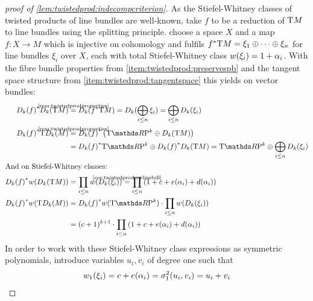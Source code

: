 \begin{proof}[proof of \autoref{lem:twistedprod:indecompcriterion}]
  As the Stiefel-Whitney classes of twisted products of line bundles
  are well-known, take $f$ to be a reduction of $\mathrm{T}M$ to line bundles
  using the splitting principle.
  \Idest choose a space $X$ and a map $f\colon X\to M$ which is
  injective on cohomology and fulfils
  ${f}^* \mathrm{T}M = \xi_1\oplus\dotsb\oplus\xi_n$ for line bundles
  $\xi_i$ over $X$, each with total Stiefel-Whitney class
  ${w}(\xi_i)=1+\alpha_i$.
  With the fibre bundle properties from
  \ref{item:twistedprod:preservespb}
  and the tangent space structure from
  \ref{item:twistedprod:tangentspace}
  this yields on vector bundles:
  \begin{align*}
    \pb{\Twistedprod{k}{f}} \Twistedprod{k}{\T M}
    &\cequalsby{\autoref{rem:twistedprodproperties}}
      \Twistedprod{k}{\pb f \T M}
      = \Twistedprod{k}{\bigoplus_{i\leq n}\xi_i}
      = \bigoplus_{i\leq n}\Twistedprod{k}{\xi_i}
    \\
    \pb{\Twistedprod{k}{f}} \T{\Twistedprod{k}{M}}
    &\cequalsby{\autoref{rem:twistedprodproperties}}
      \pb{\Twistedprod{k}{f}} \left(
      \T{\RP k} \oplus \Twistedprod{k}{\T M}
      \right)\\
    &= \pb{\Twistedprod{k}{f}} \T{\RP k}
      \oplus
      \pb{\Twistedprod{k}{f}} \Twistedprod{k}{\T M}
      = \T{\RP k} \oplus \bigoplus_{i\leq n}\Twistedprod{k}{\xi_i}\\
    \intertext{And on Stiefel-Whitney classes:}
    \pb{\Twistedprod{k}{f}} \W{\Twistedprod{k}{\T M}}
    &= \prod_{i\leq n} \W{\Twistedprod{k}{\xi_i}}
      \cequalsby{\autoref{cor:twistedprod:swlinebdl}}
      \prod_{i\leq n} \left(1 + c + e(\alpha_i) + d(\alpha_i)\right)
    \\
    \pb{\Twistedprod{k}{f}} \W{\T\Twistedprod{k}{M}}
    &= \pb{\Twistedprod{k}{f}}\W{\T{\RP k}}
      \cdot \prod_{i\leq n} \W{\Twistedprod{k}{\xi_i}} \\
    &= (c+1)^{k+1}
      \cdot \prod_{i\leq n} \left(1+c+e(\alpha_i)+d(\alpha_i)\right)
  \end{align*}
  In order to work with these Stiefel-Whitney class expressions as
  symmetric polynomials, introduce variables $u_i, v_i$ of degree
  one such that
  \begin{align*}
    \w1{\xi_i} &= c+e(\alpha_i) = \el 1 2(u_i, v_i) = u_i+v_i \\

\end{align*}
\end{proof}
